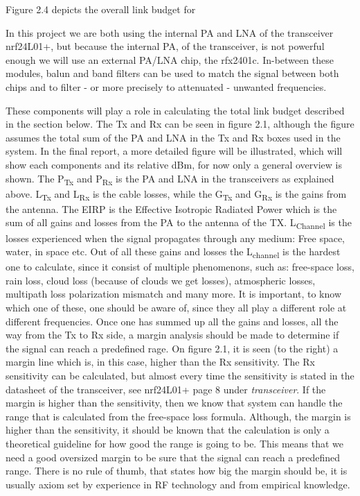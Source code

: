 Figure 2.4 depicts the overall link budget for 

In this project we are both using the internal PA and LNA of the transceiver nrf24L01+\cite{nrf24l01+}, but because the internal PA, of the transceiver, is not powerful enough we will use an external PA/LNA chip, the rfx2401c\cite{RFX2401C}. In-between these modules, balun and band filters can be used to match the signal between both chips and to filter - or more precisely to attenuated - unwanted frequencies.

These components will play a role in calculating the total link budget described in the section below. The Tx and Rx can be seen in figure 2.1, although the figure assumes the total sum of the PA and LNA in the Tx and Rx boxes used in the system. In the final report, a more detailed figure will be illustrated, which will show each components and its relative dBm, for now only a general overview is shown. The P\textsubscript{Tx} and P\textsubscript{Rx} is the PA and LNA in the transceivers as explained above. L\textsubscript{Tx} and L\textsubscript{Rx} is the cable losses, while the G\textsubscript{Tx} and G\textsubscript{Rx} is the gains from the antenna. The EIRP is the Effective Isotropic Radiated Power which is the sum of all gains and losses from the PA to the antenna of the TX. 
L\textsubscript{Channel} is the losses experienced when the signal propagates through any medium: Free space, water, in space etc. Out of all these gains and losses the L\textsubscript{channel} is the hardest one to calculate, since it consist of multiple phenomenons, such as: free-space loss, rain loss, cloud loss (because of clouds we get losses), atmospheric losses, multipath loss polarization mismatch and many more. It is important, to know which one of these, one should be aware of, since they all play a different role at different frequencies. Once one has summed up all the gains and losses, all the way from the Tx to Rx side, a margin analysis should be made to determine if the signal can reach a predefined rage. On figure 2.1, it is seen (to the right) a margin line which is, in this case, higher than the Rx sensitivity. The Rx sensitivity can be calculated, but almost every time the sensitivity is stated in the datasheet of the transceiver, see nrf24L01+\cite{nrf24l01+} page 8 under \textit{transceiver}. If the margin is higher than the sensitivity, then we know that system can handle the range that is calculated from the free-space loss formula. Although, the margin is higher than the sensitivity, it should be known that the calculation is only a theoretical guideline for how good the range is going to be. This means that we need a good oversized margin to be sure that the signal can reach a predefined range. There is no rule of thumb, that states how big the margin should be, it is usually axiom set by experience in RF technology and from empirical knowledge.

